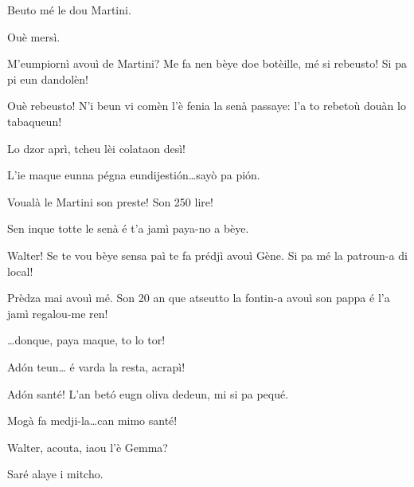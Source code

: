 \begin{drama}
\Dorinaspeaks Beuto mé le dou Martini.

\Genespeaks{} Ouè mersì.

\Walterspeaks	M'eumpiornì avouì de Martini? Me fa nen bèye doe botèille, mé si rebeusto! Si pa pi eun dandolèn!

\Genespeaks{} Ouè rebeusto! N'i beun vi comèn l'è fenia la senà passaye: l'a to rebetoù douàn lo tabaqueun!


\Genespeaks Lo dzor aprì, tcheu lèi colataon desì!

\Walterspeaks L'ie maque eunna pégna eundijesti\'on\ldots sayò pa pi\'on.


\Dorinaspeaks Voualà le Martini son preste! Son 250 lire! 

\Walterspeaks	Sen inque totte le senà é t'a  jamì paya-no a bèye.

\Dorinaspeaks{} Walter! Se te vou bèye sensa paì te fa prédjì avouì Gène. Si pa mé la patroun-a di local!


\Genespeaks Prèdza mai avouì mé.  Son 20 an que atseutto la fontin-a avouì son pappa é l'a jamì regalou-me ren!


\Genespeaks{} \ldots donque, paya maque, to lo tor!

\Walterspeaks	Ad\'on teun\ldots {} é varda la resta, acrapì!

\Selmospeaks{} Ad\'on santé! L'an bet\'o eugn oliva dedeun, mi si pa pequé.

\Walterspeaks Mogà fa medji-la\ldots can mimo santé!




\Kettyspeaks{} Walter, acouta, iaou l'è Gemma?

 
\Walterspeaks	Saré alaye i mitcho.


\end{drama}
